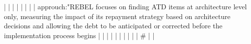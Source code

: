 |    |            |      |                                                                      |                                                                                                                                                                          |                                                                                                                                                                                                                                                            |                                                                                                                                                                                                                                                                      | approuch:"REBEL focuses on finding ATD items at architecture level only, measuring the impact of its repayment strategy based on architecture decisions and allowing the debt to be anticipated or corrected before the implementation process begins                                                    |                                                                                                                                                                                                                                                                                                                                                                                                                                                                                              |
|    |            |      |                                                                      |                                                                                                                                                                          |                                                                                                                                                                                                                                                            |                                                                                                                                                                                                                                                                      | #                                                                                                                                                                                                                                                                                                        |                                                                                                                                                                                                                                                                                                                                                                                                                                                                                              |
